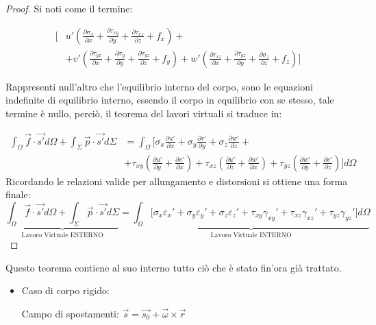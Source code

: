 \documentclass{article}
\begin{document}
\begin{adjustwidth}{2in}{}
\begin{proof}
	Si noti come il termine:
	 
	 \[ \begin{split} \Bigg[ & u'\left( \frac{\partial \sigma_x}{\partial x} + \frac{\partial \tau_{xy}}{\partial y} + \frac{\partial \tau_{xz}}{\partial z} + f_x\right) + \\
	 & + v'\left( \frac{\partial \tau_{yx}}{\partial x} + \frac{\partial \sigma_y}{\partial y} + \frac{\partial \tau_{yz}}{\partial z} + f_y\right) + w'\left( \frac{\partial \tau_{xz}}{\partial x} + \frac{\partial \tau_{yz}}{\partial y} + \frac{\partial \sigma_z}{\partial z} + f_z\right) \Bigg] \end{split}\]
 
	 Rappresenti null'altro che l'equilibrio interno del corpo, sono le equazioni indefinite di equilibrio interno, essendo il corpo in equilibrio con se stesso, tale termine è nullo, perciò, il teorema del lavori virtuali si traduce in:
	 
	 \[ \begin{split}
	 \int_{\Omega} \vec{f} \cdot \vec{s'} d\Omega + \int_{\Sigma}\vec{p} \cdot \vec{s'} d\Sigma & =\int_{\Omega}  \Bigg[  \sigma_x \frac{\partial u'}{\partial x} + \sigma_y \frac{\partial v'}{\partial y} + \sigma_z \frac{\partial w'}{\partial z} + \\
	  & +\tau_{xy} \left( \frac{\partial u'}{\partial y} + \frac{\partial v'}{\partial x}\right) + \tau_{xz} \left( \frac{\partial u'}{\partial z} + \frac{\partial w'}{\partial x}\right) + \tau_{yz} \left( \frac{\partial w'}{\partial y} + \frac{\partial v'}{\partial z}\right) \Bigg] d\Omega
  		\end{split}
	 \]
	Ricordando le relazioni valide per allungamento e distorsioni si ottiene una forma finale: 
	 \[ 
		\underbrace{\int_{\Omega} \vec{f} \cdot \vec{s'} d\Omega + \int_{\Sigma}\vec{p} \cdot \vec{s'} d\Sigma}_\text{Lavoro Virtuale ESTERNO}  = \underbrace{\int_{\Omega}  \Bigg[  \sigma_x \varepsilon_x' + \sigma_y \varepsilon_y' + \sigma_z \varepsilon_z' 
		 +\tau_{xy} \gamma_{xy}' + \tau_{xz} \gamma_{xz}' + \tau_{yz} \gamma_{yz}' \Bigg] d\Omega}_\text{Lavoro Virtuale INTERNO}
	\] 
	
	\end{proof}

	Questo teorema contiene al suo interno tutto ciò che è stato fin'ora già trattato.

	\begin{itemize}
		\item Caso di corpo rigido:
		
		Campo di spostamenti: $\vec{s} = \vec{s_0} + \vec{\omega} \times \vec{r}$
		

\end{itemize}
\end{adjustwidth}
\end{document}

